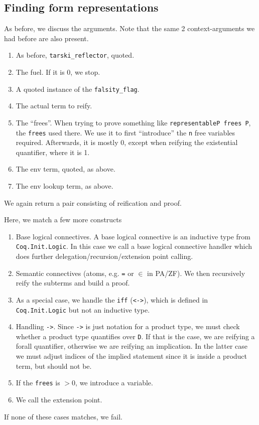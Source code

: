 \documentclass[11pt,a4paper]{article}
\begin{document}
\subsection{Finding form representations}
As before, we discuss the arguments. Note that the same 2 context-arguments we had before are also present.
\begin{enumerate}
\item As before, \lstinline|tarski_reflector|, quoted.
\item The fuel. If it is 0, we stop.
\item A quoted instance of the \lstinline|falsity_flag|.
\item The actual term to reify.
\item The \enquote{frees}. When trying to prove something like \lstinline|representableP frees P|, the \lstinline|frees| used there. We use it to first \enquote{introduce} the \lstinline|n| free variables required. Afterwards, it is mostly 0, except when reifying the existential quantifier, where it is 1.
\item The env term, quoted, as above.
\item The env lookup term, as above.
\end{enumerate}
We again return a pair consisting of reification and proof.

Here, we match a few more constructs
\begin{enumerate}
	\item Base logical connectives. A base logical connective is an inductive type from \lstinline|Coq.Init.Logic|. In this case we call a base logical connective handler which does further delegation/recursion/extension point calling.
	\item Semantic connectives (atoms, e.g. \lstinline|=| or $\in$ in PA/ZF). We then recursively reify the subterms and build a proof.
	\item As a special case, we handle the \lstinline|iff| (\lstinline|<->|), which is defined in \lstinline|Coq.Init.Logic| but not an inductive type.
	\item Handling \lstinline|->|. Since \lstinline|->| is just notation for a product type, we must check whether a product type quantifies over \lstinline|D|. If that is the case, we are reifying a forall quantifier, otherwise we are reifying an implication. In the latter case we must adjust indices of the implied statement since it is inside a product term, but should not be.
	\item If the \lstinline|frees| is $>0$, we introduce a variable.
	\item We call the extension point.
\end{enumerate}
If none of these cases matches, we fail.
\end{document}
